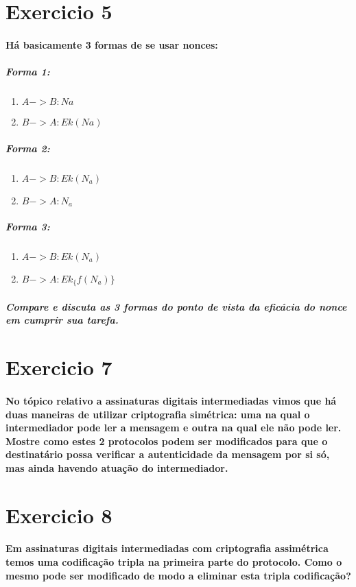 \documentclass[10pt,a4paper]{report}
\begin{document}
\section*{Exercicio 5}
\paragraph{Há basicamente 3 formas de se usar nonces:}
\subparagraph{Forma 1:}
\begin{enumerate}[(1)]
\item $A -> B : Na$
\item $B -> A : Ek(Na)$
\end{enumerate}
\subparagraph{Forma 2:}
\begin{enumerate}[(1)]
\item $A -> B : Ek(N_a)$
\item $B -> A : N_a$
\end{enumerate}
\subparagraph{Forma 3:}
\begin{enumerate}[(1)]
\item $A -> B : Ek(N_a)$
\item $B -> A : Ek_\{f(N_a)\}$
\end{enumerate}
\subparagraph{Compare e discuta as 3 formas do ponto de vista da eficácia do nonce em cumprir sua tarefa.}
\section*{Exercicio 7}
\paragraph{ No tópico relativo a assinaturas digitais intermediadas vimos que há duas maneiras de utilizar criptografia simétrica: uma na qual o intermediador pode ler a mensagem e outra na qual ele não pode ler. Mostre como estes 2 protocolos podem ser modificados para que o destinatário possa verificar a autenticidade da mensagem por si só, mas ainda havendo atuação do intermediador.}
\section*{Exercicio 8}
\paragraph{ Em assinaturas digitais intermediadas com criptografia assimétrica temos uma codificação tripla na primeira parte do protocolo. Como o mesmo pode ser modificado de modo a eliminar esta tripla codificação?}
\end{document}
